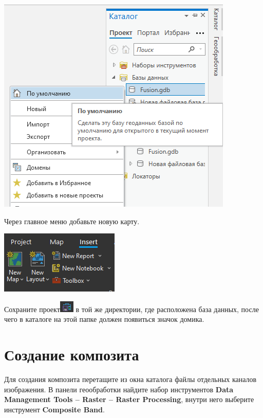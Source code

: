 \documentclass[
  12pt,
]{book}
\begin{document}
\includegraphics{images/Ref01/Default.png}

Через главное меню добавьте новую карту.

\includegraphics{images/Ref01/New_Map.png}

Сохраните проект\includegraphics{images/Ref01/Save_Project.png} в той же директории, где расположена база данных, после чего в каталоге на этой папке должен появиться значок домика.

\hypertarget{pansharpen-composite}{%
\section{Создание композита}\label{pansharpen-composite}}

Для создания композита перетащите из окна каталога файлы отдельных каналов изображения. В панели геообработки найдите набор инструментов \textbf{Data Management Tools -- Raster -- Raster Processing}, внутри него выберите инструмент \textbf{Composite Band}.
\end{document}
